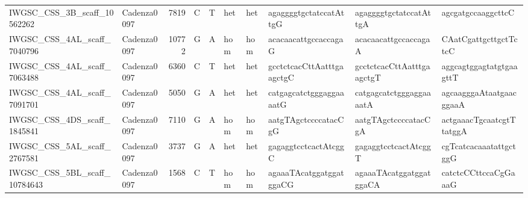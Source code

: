 \begin{tabular}{llrlllllll}
 IWGSC\_CSS\_3B\_scaff\_10562262  & Cadenza0097 &       7819 & C         & T        & het            & het         & agaggggtgctatccatAttgG    & agaggggtgctatccatAttgA    & agcgatgccaaggcttcC        \\
 IWGSC\_CSS\_4AL\_scaff\_7040796  & Cadenza0097 &      10772 & G         & A        & hom            & hom         & acacaacattgccaccagaG      & acacaacattgccaccagaA      & CAatCgattgcttgctTctcC     \\
 IWGSC\_CSS\_4AL\_scaff\_7063488  & Cadenza0097 &       6360 & C         & T        & het            & het         & gcctctcacCttAatttgaagctgC & gcctctcacCttAatttgaagctgT & aggcagtggagtatgtgaagttT   \\
 IWGSC\_CSS\_4AL\_scaff\_7091701  & Cadenza0097 &       5050 & G         & A        & het            & het         & catgagcatctgggaggaaaatG   & catgagcatctgggaggaaaatA   & agcaagggaAtaatgaacggaaA   \\
 IWGSC\_CSS\_4DS\_scaff\_1845841  & Cadenza0097 &       7110 & G         & A        & hom            & hom         & aatgTAgctccccatacCgG      & aatgTAgctccccatacCgA      & actgaaacTgcaatcgtTtatggA  \\
 IWGSC\_CSS\_5AL\_scaff\_2767581  & Cadenza0097 &       3737 & G         & A        & het            & het         & gagaggtcctcactAtcggC      & gagaggtcctcactAtcggT      & cgTcatcacaaatattgctggG    \\
 IWGSC\_CSS\_5BL\_scaff\_10784643 & Cadenza0097 &       1568 & C         & T        & hom            & hom         & agaaaTAcatggatggatggaCG   & agaaaTAcatggatggatggaCA   & catctcCCttccaCgGaaaG      \\
\bottomrule
\end{tabular}
